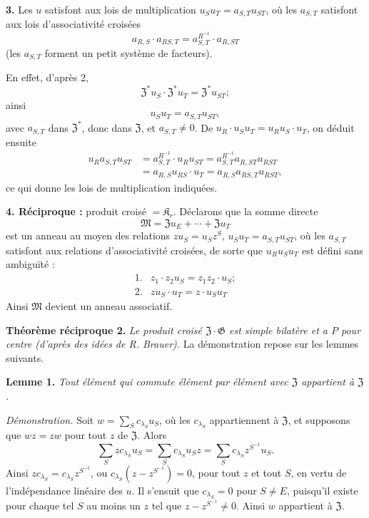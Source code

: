 \noindent\textbf{3.} Les \(u\) satisfont aux lois de multiplication \(u_Su_T=a_{S,T}u_{ST}\), où les \(a_{S,T}\) satisfont aux lois d'associativité croisées
\[
a_{R,S}\cdot a_{RS,T}=a_{S,T}^{R^{-1}}\cdot a_{R,ST}
\]
(les \(a_{S,T}\) forment un petit système de facteurs).

En effet, d'après 2,
\[
\mathfrak Z^*u_S\cdot\mathfrak Z^*u_T=\mathfrak Z^*u_{ST};
\]
ainsi
\[
u_Su_T=a_{S,T}u_{ST},
\]
avec \(a_{S,T}\) dans \(\mathfrak Z^*\), donc dans \(\mathfrak Z\), et \(a_{S,T}\neq0\). De \(u_R\cdot u_Su_T=u_Ru_S\cdot u_T\), on déduit ensuite
\[
\begin{aligned}
u_Ra_{S,T}u_{ST}
&=a_{S,T}^{R^{-1}}\cdot u_Ru_{ST}
 =a_{S,T}^{R^{-1}}a_{R,ST}u_{RST}\\
&=a_{R,S}u_{RS}\cdot u_T
 =a_{R,S}a_{RS,T}u_{RST},
\end{aligned}
\]
ce qui donne les lois de multiplication indiquées.

\noindent\textbf{4. Réciproque :} produit croisé \(=\mathfrak K_r\). Déclarons que la somme directe
\[
\mathfrak M=\mathfrak Zu_E+\cdots+\mathfrak Zu_T
\]
est un anneau au moyen des relations \(zu_S=u_Sz^S\), \(u_Su_T=a_{S,T}u_{ST}\), où les \(a_{S,T}\) satisfont aux relations d'associativité croisées, de sorte que \(u_Ru_Su_T\) est défini sans ambiguïté :
\[
\begin{array}{ll}
1.&z_1\cdot z_2u_S=z_1z_2\cdot u_S;\\[2pt]
2.&zu_S\cdot u_T=z\cdot u_Su_T
\end{array}
\]
Ainsi \(\mathfrak M\) devient un anneau associatif.

\noindent\textbf{Théorème réciproque 2.} \emph{Le produit croisé \(\mathfrak Z\cdot\mathfrak G\) est simple bilatère et a \(P\) pour centre (d'après des idées de R. Brauer).} La démonstration repose sur les lemmes suivants.

\noindent\textbf{Lemme 1.} \emph{Tout élément qui commute élément par élément avec \(\mathfrak Z\) appartient à \(\mathfrak Z\).}

\noindent\emph{Démonstration.} Soit \(w=\sum_S c_{\lambda_S}u_S\), où les \(c_{\lambda_S}\) appartiennent à \(\mathfrak Z\), et supposons que \(wz=zw\) pour tout \(z\) de \(\mathfrak Z\). Alors
\[
\sum_S zc_{\lambda_S}u_S
 =\sum_S c_{\lambda_S}u_Sz
 =\sum_S c_{\lambda_S}z^{S^{-1}}u_S.
\]
Ainsi \(zc_{\lambda_S}=c_{\lambda_S}z^{S^{-1}}\), ou \(c_{\lambda_S}(z-z^{S^{-1}})=0\), pour tout \(z\) et tout \(S\), en vertu de l'indépendance linéaire des \(u\). Il s'ensuit que \(c_{\lambda_S}=0\) pour \(S\neq E\), puisqu'il existe pour chaque tel \(S\) au moins un \(z\) tel que \(z-z^{S^{-1}}\neq0\). Ainsi \(w\) appartient à \(\mathfrak Z\).

